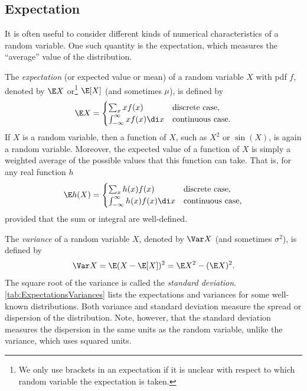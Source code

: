 \subsection{Expectation}
It is often useful to consider different kinds of numerical characteristics of a random variable. One such quantity is the expectation, which measures the ``average'' value of the distribution.

The \textit{expectation} (or expected value or mean) of a random variable \(X\) with pdf \(f\), denoted by \(\E X\) or\footnote{We only use brackets in an expectation if it is unclear with respect to which random variable the expectation is taken.} \(\E[X]\) (and sometimes \(\mu\)), is defined by
\begin{equation*}
	\E X =
	\begin{cases}
		\sum_x x f(x)                      & \text{discrete case,}   \\
		\int_{-\infty}^\infty x f(x) \di x & \text{continuous case.}
	\end{cases}
\end{equation*}
If \(X\) is a random variable, then a function of \(X\), such as \(X^2\) or \(\sin(X)\), is again a random variable. Moreover, the expected value of a function of \(X\) is simply a weighted average of the possible values that this function can take. That is, for any real function \(h\)
\begin{equation*}
	\E h(X) =
	\begin{cases}
		\sum_x h(x) f(x)                      & \text{discrete case,}   \\
		\int_{-\infty}^\infty h(x) f(x) \di x & \text{continuous case,}
	\end{cases}
\end{equation*}
provided that the sum or integral are well-defined.

The \textit{variance} of a random variable \(X\), denoted by \(\Var X\) (and sometimes \(\sigma^2\)), is defined by
\begin{equation*}
	\Var X = \E(X - \E[X])^2 = \E X^2 - (\E X)^2.
\end{equation*}
The square root of the variance is called the \textit{standard deviation}. \cref{tab:ExpectationsVariances} lists the expectations and variances for some well-known distributions. Both variance and standard deviation measure the spread or dispersion of the distribution. Note, however, that the standard deviation measures the dispersion in the same units as the random variable, unlike the variance, which uses squared units.

